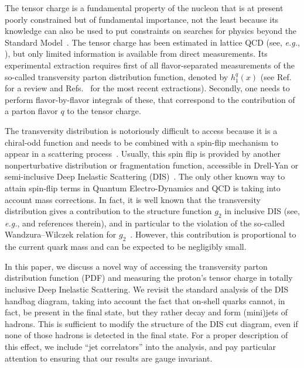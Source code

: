 \documentclass[preprintnumbers,floatfix,nofootinbib]{revtex4}
\newcommand{\eg}{{\em e.g.}}
\begin{document}
The tensor charge is a fundamental property of the nucleon that is at
present poorly constrained but of fundamental importance, not the least because its knowledge can also be used to put constraints on searches for physics beyond the Standard Model~\cite{Cirigliano:2013xha,Bhattacharya:2015esa,Courtoy:2015haa}.
The tensor charge has been estimated in lattice QCD (see, \eg,
\cite{Green:2012ej,Bali:2014nma,Bhattacharya:2015wna,Abdel-Rehim:2015owa,Bhattacharya:2016zcn}), but
only limited information is available from direct measurements. Its experimental extraction requires first of all flavor-separated measurements of the so-called transversity parton distribution function,
denoted by $h_1^q(x)$ (see Ref.~\cite{Barone:2001sp} for a review and
Refs.~\cite{Radici:2015mwa,Anselmino:2015sxa,Kang:2015msa} for the most recent
extractions). Secondly, one needs to perform flavor-by-flavor integrals of these, that correspond to the contribution of a parton flavor $q$ to the tensor charge. 

The transversity distribution is notoriously difficult to access because it is
a chiral-odd function and needs to be combined with a spin-flip mechanism to
appear in a scattering process~\cite{Jaffe:1996zw}. Usually, this spin flip is provided by another
nonperturbative distribution or fragmentation function, accessible in Drell-Yan or semi-inclusive Deep Inelastic Scattering (DIS)~\cite{Ralston:1979ys,Jaffe:1991kp,Jaffe:1993xb,Collins:1992kk}.
The only other known way to attain spin-flip terms in Quantum Electro-Dynamics and QCD is taking into account mass corrections. In fact, it is well known that the transversity distribution gives a contribution to the structure function $g_2$ in inclusive DIS (see, \eg, \cite{Accardi:2009au} and references therein), and in particular to the violation of the so-called Wandzura--Wilczek relation for $g_2$~\cite{Wandzura:1977qf}. However, this contribution is proportional to the current quark mass and can be expected to be negligibly small.


In this paper, we discuss a novel way of accessing the transversity parton distribution function (PDF) and measuring the proton's tensor charge in totally inclusive Deep Inelastic Scattering. 
We revisit the standard analysis of the DIS handbag diagram, taking into account the fact that on-shell quarks cannot, in fact, be present in the final state, but they rather decay and form (mini)jets of hadrons. This is sufficient to modify the structure of the DIS cut diagram, even if none of those hadrons is detected in the final state. For a proper description of this effect, we include ``jet correlators'' into the analysis, and pay particular attention to ensuring that our results are gauge invariant.
\end{document}
